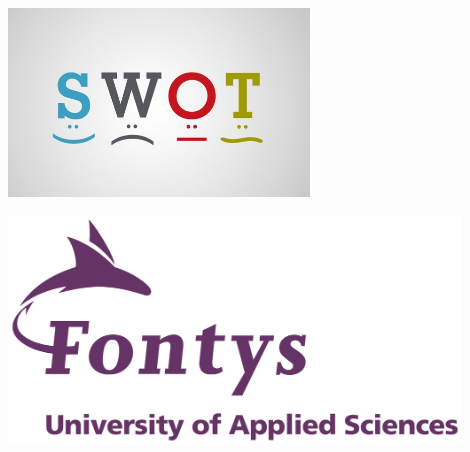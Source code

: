 \begin{titlepage}
    \begin{center}
        \vspace*{0.1cm}

        \Huge
        \textbf{\documentTitle}

        \vspace{0.3cm}
        \LARGE
        \documentSubtitle\\

        \vspace*{1.5cm}
        \includegraphics[width=0.6\textwidth]{images/swot.jpg}

        \vspace*{3.5cm}
        \begin{minipage}{0.5\textwidth}
            \centering
        \end{minipage}%
        \begin{minipage}{0.5\textwidth}
            \centering
            \includegraphics[width=0.9\textwidth]{images/fontys_logo.png}
        \end{minipage}%
    \end{center}
    \vfill


\end{titlepage}
